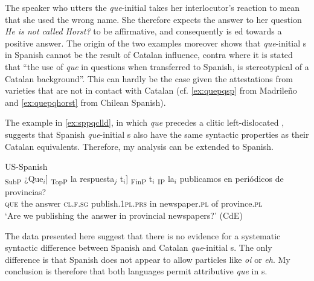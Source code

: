 The speaker who utters the \emph{que}-initial  takes her interlocutor's reaction to mean that she used the wrong name. She therefore expects the answer to her question \emph{He is not called Horst?} to be affirmative, and consequently  is ed towards a positive answer. The origin of the two examples moreover shows  that \emph{que}-initial s in Spanish cannot be the result of Catalan influence, contra \citet[2]{Hualde1992} where it is stated that ``the use of \emph{que} in questions when transferred to Spanish, is stereotypical of a Catalan background''. This can hardly be the case given the attestations from varieties that are not in contact with Catalan (cf. \eqref{ex:quepqsp} from Madrileño and \eqref{ex:quepqhorst} from Chilean Spanish). 

The example in  \eqref{ex:sppqclld}, in which \emph{que} precedes a clitic left-dislocated , suggests that  Spanish \emph{que}-initial s also have the same syntactic properties as their Catalan equivalents. Therefore, my analysis can be extended to Spanish.

\ea\label{ex:sppqclld}
US-Spanish \\
\gll  {\ob}\textsubscript{SubP} ¿Que$_i$] {\ob}\textsubscript{TopP} la respuesta$_j$ t$_i$] {\ob}\textsubscript{FinP} t$_i$ {\ob}\textsubscript{IP} la$_i$ publicamos en periódicos de provincias? \\
{} \textsc{que} {} the answer {} {} {} {} \textsc{cl.f.sg} publish.\textsc{1pl.prs} in newspaper.\textsc{pl} of province.\textsc{pl}\\
\glt `Are we publishing the answer in provincial newspapers?' (CdE)
\z

The data presented here suggest that there is no evidence for a systematic syntactic  difference between Spanish and Catalan \emph{que}-initial s. The only difference is that Spanish does not appear to allow particles like \emph{oi} or \emph{eh}.  My conclusion is therefore that both languages permit attributive \emph{que} in s. 


